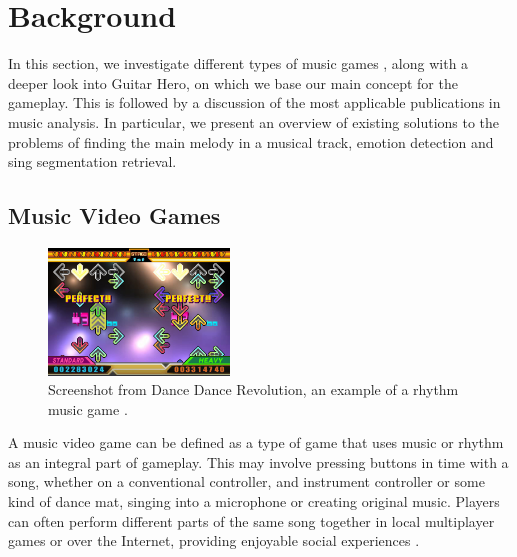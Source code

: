 
\chapter{Background} 

\label{Chapter4} 



In this section, we investigate different types of music games \cite{gametypes}, along with a deeper look into Guitar Hero, on which we base our main concept for the gameplay. This is followed by a discussion of the most applicable publications in music analysis. In particular, we present an overview of existing solutions to the problems of finding the main melody in a musical track, emotion detection and sing segmentation retrieval.

\vspace{20pt}


\section{Music Video Games }

\begin{figure}
  \vspace{-40pt}

  \begin{center}
    \includegraphics[width=0.43\textwidth]{Figures/dancedancerevolution}
  \end{center}
  \caption{Screenshot from Dance Dance Revolution, an example of a rhythm music game \cite{DDR}.}
  \label{fig:DDR}
\end{figure}

A music video game can be defined as a type of game that uses music or rhythm as an integral part of gameplay. This may involve pressing buttons in time with a song, whether on a conventional controller, and instrument controller or some kind of dance mat, singing into a microphone or creating original music. Players can often perform different parts of the same song together in local multiplayer games or over the Internet, providing enjoyable social experiences \cite{mvgdef}.

